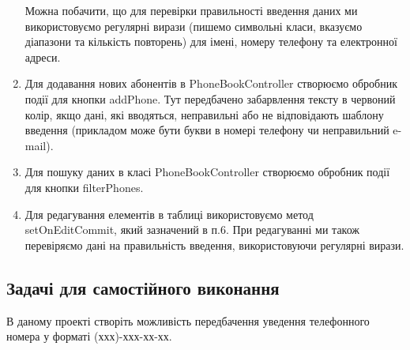 \begin{enumerate}
		Можна побачити, що для перевірки правильності введення даних ми використовуємо регулярні вирази (пишемо символьні класи, вказуємо діапазони та кількість повторень) для імені, номеру телефону та електронної адреси.
		\item Для додавання нових абонентів в PhoneBookController створюємо обробник події для кнопки addPhone.
		Тут передбачено забарвлення тексту в червоний колір, якщо дані, які вводяться, неправильні або не відповідають шаблону введення (прикладом може бути букви в номері телефону чи неправильний e-mail).
		\item Для пошуку даних в класі PhoneBookController створюємо обробник події для кнопки filterPhones.
		\item Для редагування елементів в таблиці використовуємо метод setOnEditCommit, який зазначений в п.6. При редагуванні ми також перевіряємо дані на правильність введення, використовуючи регулярні вирази.
		
	\end{enumerate}
	
	\subsection{Задачі для самостійного виконання}
	В даному проекті створіть можливість передбачення уведення телефонного номера у форматі (ххх)-ххх-хх-хх.